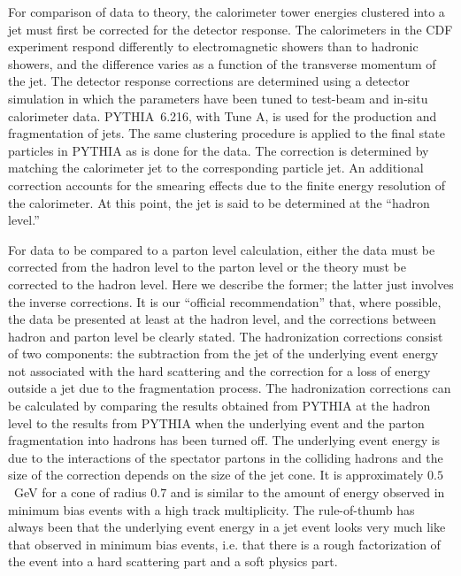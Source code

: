 \documentclass[12pt]{iopart}
\begin{document}
For comparison of data to theory, the calorimeter tower energies clustered into a jet  must first be corrected for the detector
response. The calorimeters in the CDF experiment  respond differently to electromagnetic  showers than to hadronic showers, and the
difference  varies as a function of the transverse momentum of the jet. The detector response corrections  are determined using a
detector simulation in which the parameters have been tuned to test-beam  and in-situ calorimeter data. PYTHIA~6.216, with Tune A,  is
used for  the production and  fragmentation of jets. 
The same clustering procedure is  applied to the final state particles in PYTHIA as is done for the data. The correction is  determined
by matching the calorimeter jet to the corresponding particle jet. An additional  correction accounts for the smearing effects due
to the finite energy resolution of the  calorimeter. At this point, the jet is said to be determined at the ``hadron level.''

For data to be compared to a parton level calculation, either the data must be corrected  from the hadron level to the parton level or
the theory must be corrected to the hadron level.  Here we describe the former; the latter just involves  the inverse corrections. It
is our ``official recommendation'' that, where possible, the data  be presented at least at the hadron level, and the corrections between hadron and parton level be clearly stated. The hadronization  corrections consist of two components:  the subtraction  from the jet of the
underlying event  energy  not associated with the hard scattering and the correction for a loss of energy outside  a jet due to the
fragmentation process. The hadronization corrections can be calculated by  comparing the results obtained from PYTHIA at the hadron
level to the results from PYTHIA when  the underlying event and the parton fragmentation into hadrons has been turned off. The
underlying  event energy is due to the  interactions of the spectator partons in the colliding hadrons and the  size of the  correction
depends on the size of the jet cone. It is approximately $0.5$~GeV for a cone of radius $0.7$ and is similar to the amount of energy
observed in minimum bias events with a  high track multiplicity. The rule-of-thumb has always been that the underlying event energy in
a jet event looks very much like that observed in minimum bias events, i.e. that there is a rough factorization of the event into a
hard scattering part and a soft physics part. 
\end{document}
